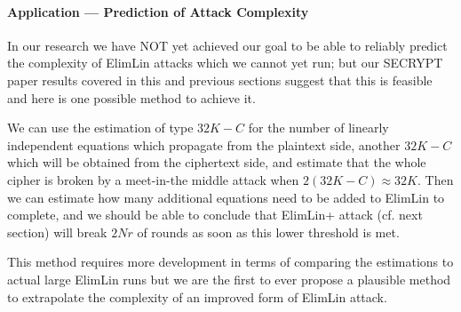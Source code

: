 \paragraph{Application --- Prediction of Attack Complexity}
In our research we have NOT yet achieved our goal to be able to reliably predict the complexity of ElimLin attacks which we cannot yet run; but our SECRYPT paper results covered in this and previous sections suggest that this is feasible and here is one possible method to achieve it. 

\begin{conj} \label{Con:ElimLin}
We can use the estimation of type $32K-C$ for the number of linearly independent equations 
which propagate from the plaintext side, another $32K-C$ which will be obtained from the ciphertext side, 
and estimate that the whole cipher is broken by a meet-in-the middle attack when $2(32K-C)\approx 32K$. 
Then we can estimate how many additional equations need to be added to ElimLin to complete, 
and we should be able to conclude that ElimLin+ attack (cf. next section) 
will break $2Nr$ of rounds as soon as this lower threshold is met. 

This method requires more development in terms of comparing the estimations to actual large ElimLin runs 
but we are the first to ever propose a plausible method to extrapolate the complexity of an improved 
form of ElimLin attack. 
\end{conj}

